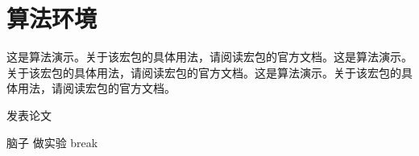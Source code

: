 \section{算法环境}
这是算法演示。关于该宏包的具体用法，请阅读宏包的官方文档。这是算法演示。关于该宏包的具体用法，请阅读宏包的官方文档。这是算法演示。关于该宏包的具体用法，请阅读宏包的官方文档。


\begin{algorithm}[htb]
\small
    \caption{发表论文}
    \begin{algorithmic}[1] %
        \Require 脑子  
            做实验
                \State break
            \EndIf
        \EndWhile 
        \end{algorithmic}  
    \end{algorithm} 

